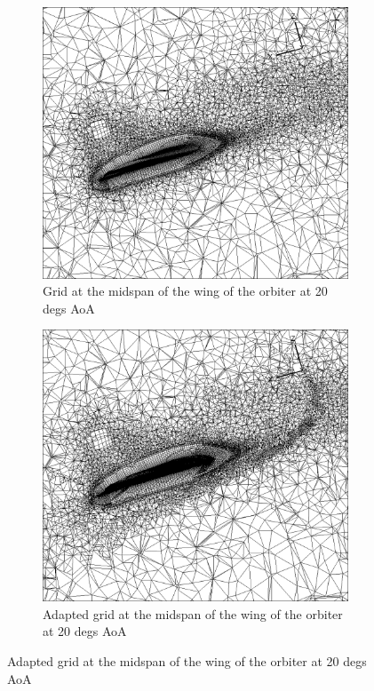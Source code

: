 \begin{figure}[H]

	\centering
    \begin{subfigure}[b]{0.65\textwidth}
         \centering
		 \includegraphics[width=\textwidth]{report_images/20_wing_grid.png}
		 \caption{Grid at the midspan of the wing of the orbiter at 20 degs AoA}
		 \label{fig: 20_wing_grid}
    \end{subfigure} 
    \begin{subfigure}[b]{0.65\textwidth}
         \centering
		 \includegraphics[width=\textwidth]{report_images/20_adapted_wing_grid.png}
		 \caption{Adapted grid at the midspan of the wing of the orbiter at 20 degs AoA}
		 \label{fig: 20_adapted_wind_grid}
    \end{subfigure}
\end{figure}

